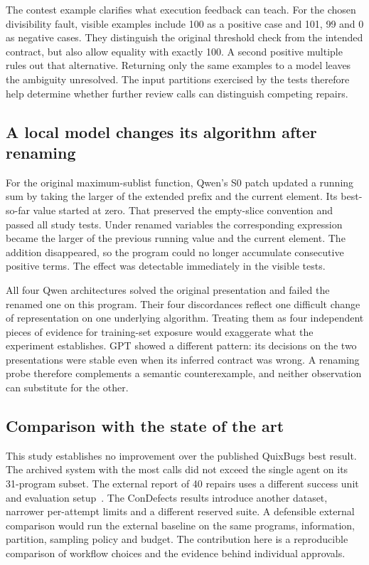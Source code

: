 \documentclass[conference]{IEEEtran}
\begin{document}
The contest example clarifies what execution feedback can teach. For the chosen divisibility fault, visible examples include 100 as a positive case and 101, 99 and 0 as negative cases. They distinguish the original threshold check from the intended contract, but also allow equality with exactly 100. A second positive multiple rules out that alternative. Returning only the same examples to a model leaves the ambiguity unresolved. The input partitions exercised by the tests therefore help determine whether further review calls can distinguish competing repairs.

\subsection{A local model changes its algorithm after renaming}
For the original maximum-sublist function, Qwen's S0 patch updated a running sum by taking the larger of the extended prefix and the current element. Its best-so-far value started at zero. That preserved the empty-slice convention and passed all study tests. Under renamed variables the corresponding expression became the larger of the previous running value and the current element. The addition disappeared, so the program could no longer accumulate consecutive positive terms. The effect was detectable immediately in the visible tests.

All four Qwen architectures solved the original presentation and failed the renamed one on this program. Their four discordances reflect one difficult change of representation on one underlying algorithm. Treating them as four independent pieces of evidence for training-set exposure would exaggerate what the experiment establishes. GPT showed a different pattern: its decisions on the two presentations were stable even when its inferred contract was wrong. A renaming probe therefore complements a semantic counterexample, and neither observation can substitute for the other.

\subsection{Comparison with the state of the art}
This study establishes no improvement over the published QuixBugs best result. The archived system with the most calls did not exceed the single agent on its 31-program subset. The external report of 40 repairs uses a different success unit and evaluation setup~\cite{hu}. The ConDefects results introduce another dataset, narrower per-attempt limits and a different reserved suite. A defensible external comparison would run the external baseline on the same programs, information, partition, sampling policy and budget. The contribution here is a reproducible comparison of workflow choices and the evidence behind individual approvals.
\end{document}
